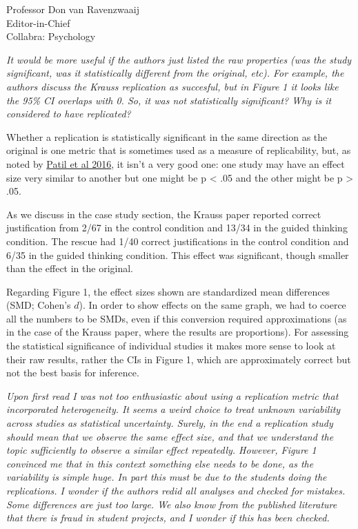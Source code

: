 \documentclass{stanfordletter}
\newcounter{section}
\newcommand{\theysaid}[1]{\begin{leftbar} \noindent 
		\textsl{ #1}\end{leftbar}}
\begin{document}
\begin{letter}{Professor Don van Ravenzwaaij \\ Editor-in-Chief \\ Collabra: Psychology }
	
	\theysaid{
		It would be more useful if the authors just listed the raw properties (was the study significant, was it statistically different from the original, etc). For example, the authors discuss the Krauss replication as succesful, but in Figure 1 it looks like the 95\% CI overlaps with 0. So, it was not statistically significant? Why is it considered to have replicated?}
	
	Whether a replication is statistically significant in the same direction as the original is one metric that is sometimes used as a measure of replicability, but, as noted by \href{https://journals.sagepub.com/doi/10.1177/1745691616646366}{Patil et al 2016}, it isn't a very good one: one study may have an effect size very similar to another but one might be p < .05 and the other might be p > .05.  
	
	As we discuss in the case study section, the Krauss paper reported correct justification from 2/67 in the control condition and 13/34 in the guided thinking condition.  The rescue had 1/40  correct justifications in the control condition and 6/35 in the guided thinking condition. This effect was significant, though smaller than the effect in the original. 
	
	Regarding Figure 1, the effect sizes shown are standardized mean differences (SMD; Cohen's $d$). In order to show effects on the same graph, we had to coerce all the numbers to be SMDs, even if this conversion required approximations (as in the case of the Krauss paper, where the results are proportions). For assessing the statistical significance of individual studies it makes more sense to look at their raw results, rather the CIs in Figure 1, which are approximately correct but not the best basis for inference. 
	
	\theysaid{Upon first read I was not too enthusiastic about using a replication metric that incorporated heterogeneity. It seems a weird choice to treat unknown variability across studies as statistical uncertainty. Surely, in the end a replication study should mean that we observe the same effect size, and that we understand the topic sufficiently to observe a similar effect repeatedly. However, Figure 1 convinced me that in this context something else needs to be done, as the variability is simple huge. In part this must be due to the students doing the replications. I wonder if the authors redid all analyses and checked for mistakes. Some differences are just too large. We also know from the published literature that there is fraud in student projects, and I wonder if this has been checked.}
	

\end{letter}
\end{document}
